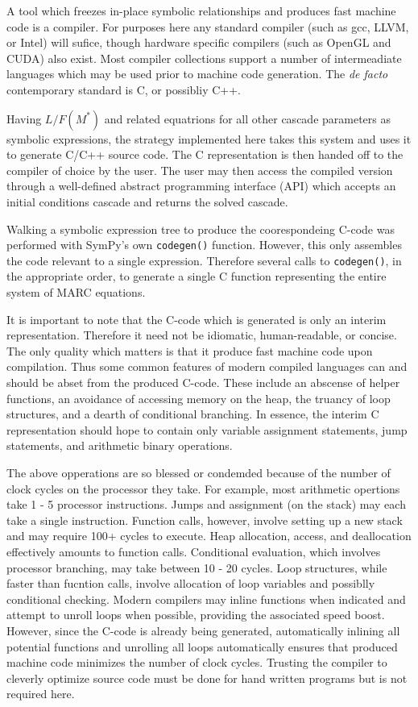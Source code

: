 \documentclass[preprint,12pt]{elsarticle}
\begin{document}
A tool which freezes in-place symbolic relationships and produces fast machine 
code is a compiler.  For purposes here any standard compiler (such as gcc, LLVM, or 
Intel) will sufice, though hardware specific compilers (such as OpenGL and CUDA)
also exist.  Most compiler collections support a number of intermeadiate languages
which may be used prior to machine code generation.  The \emph{de facto} contemporary
standard is C, or possibliy C++.

Having $L/F(M^*)$ and related equatrions for all other cascade parameters as 
symbolic expressions, the strategy implemented here takes this system and uses
it to generate C/C++ source code.  The C representation is then handed off to the
compiler of choice by the user.  The user may then access the compiled version
through a well-defined abstract programming interface (API) which accepts an initial
conditions cascade and returns the solved cascade.

Walking a symbolic expression tree to produce the coorespondeing C-code was performed 
with SymPy's own \texttt{codegen()} function.  However, this only assembles the 
code relevant to a single expression.  Therefore several calls to  \texttt{codegen()},
in the appropriate order, to generate a single C function representing the entire 
system of MARC equations.

It is important to note that the C-code which is generated is only an interim 
representation.  Therefore it need not be idiomatic, human-readable, or concise.
The only quality which matters is that it produce fast machine code upon compilation.
Thus some common features of modern compiled languages can and should be abset 
from the produced C-code.  These include an abscense of helper functions, an 
avoidance of accessing memory on the heap, the truancy of loop structures, and a
dearth of conditional branching.  In essence, the interim C representation should
hope to contain only variable assignment statements, jump statements, and 
arithmetic binary operations.

The above opperations are so blessed or condemded because of the number of clock
cycles on the processor they take.  For example, most arithmetic opertions take
1 - 5 processor instructions.  Jumps and assignment (on the stack) may each take
a single instruction.  Function calls, however, involve setting up a new stack
and may require 100+ cycles to execute.  Heap allocation, access, and deallocation
effectively amounts to function calls.  Conditional evaluation, which involves
processor branching, may take between 10 - 20 cycles.  Loop structures, while faster 
than fucntion calls, involve allocation of loop variables and possiblly conditional
checking.  Modern compilers may inline functions when indicated and attempt 
to unroll loops when possible, providing the associated speed boost.  However, 
since the C-code is already being generated, automatically inlining all potential
functions and unrolling all loops automatically ensures that produced machine code 
minimizes the number of clock cycles.  Trusting the compiler to cleverly optimize
source code must be done for hand written programs but is not required here.
\end{document}
